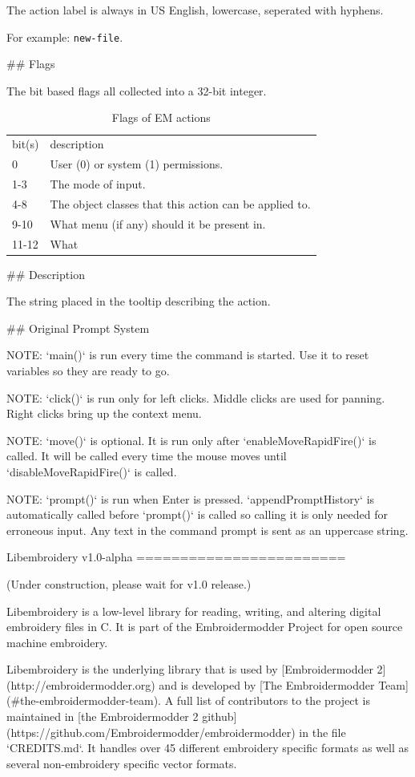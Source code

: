 \documentclass[a4paper]{report}
\begin{document}
{{{{{{{{{{{{{{{{{The action label is always in US English, lowercase,
seperated with hyphens.

For example: \texttt{new-file}.

## Flags}

The bit based flags all collected into a 32-bit integer.

\begin{table}
\begin{tabular}{l l}
bit(s) & description \\
0 & User (0) or system (1) permissions. \\
1-3 & The mode of input. \\
4-8 & The object classes that this action can be applied to. \\
9-10 & What menu (if any) should it be present in. \\ 
11-12 & What
\end{tabular}
\label{tab:flags-for-actions}
\caption{Flags of EM actions}
\end{table}

## Description}

The string placed in the tooltip describing the action.

## Original Prompt System}

NOTE: `main()` is run every time the command is started.
Use it to reset variables so they are ready to go.

NOTE: `click()` is run only for left clicks.
Middle clicks are used for panning.
Right clicks bring up the context menu.

NOTE: `move()` is optional. It is run only after
`enableMoveRapidFire()` is called. It
will be called every time the mouse moves until
`disableMoveRapidFire()` is called.

NOTE: `prompt()` is run when Enter is pressed.
`appendPromptHistory` is automatically called before `prompt()`
is called so calling it is only needed for erroneous input.
Any text in the command prompt is sent as an uppercase string.

Libembroidery v1.0-alpha
========================

(Under construction, please wait for v1.0 release.)

Libembroidery is a low-level library for reading, writing, 
and altering digital embroidery files in C. It is part of the Embroidermodder Project
for open source machine embroidery.

Libembroidery is the underlying library that is used by [Embroidermodder 2](http://embroidermodder.org)
and is developed by [The Embroidermodder Team](#the-embroidermodder-team).
A full list of contributors to the project is maintained in
[the Embroidermodder 2 github](https://github.com/Embroidermodder/embroidermodder)
in the file `CREDITS.md`.
It handles over 45 different embroidery specific formats as well
as several non-embroidery specific vector formats.

}}}}}}}}}}}}}}
\end{document}

